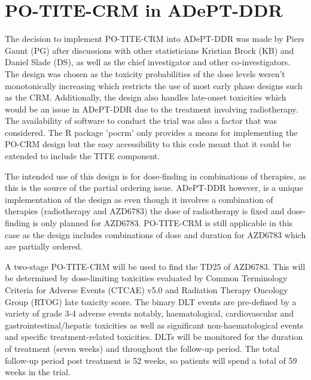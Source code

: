 
\section{PO-TITE-CRM in ADePT-DDR}  
\label{adept:PO-TITE-CRM-in-Adept}

The decision to implement PO-TITE-CRM into ADePT-DDR was made by Piers Gaunt (PG) after discussions with other statisticians Kristian Brock (KB) and Daniel Slade (DS), as well as the chief investigator and other co-investigators. The design was chosen as the toxicity probabilities of the dose levels weren't monotonically increasing which restricts the use of most early phase designs such as the CRM. Additionally, the design also handles late-onset toxicities which would be an issue in ADePT-DDR due to the treatment involving radiotherapy. The availability of software to conduct the trial was also a factor that was considered. The R package 'pocrm' \cite{wagesPocrmRpackagePhase2013} only provides a means for implementing the PO-CRM design but the easy accessibility to this code meant that it could be extended to include the TITE component.  

The intended use of this design is for dose-finding in combinations of therapies, as this is the source of the partial ordering issue. ADePT-DDR however, is a unique implementation of the design as even though it involves a combination of therapies (radiotherapy and AZD6783) the dose of radiotherapy is fixed and dose-finding is only planned for AZD6783. PO-TITE-CRM is still applicable in this case as the design includes combinations of dose and duration for AZD6783 which are partially ordered. 

A two-stage PO-TITE-CRM will be used to find the TD25 of AZD6783. This will be determined by dose-limiting toxicities evaluated by Common Terminology Criteria for Adverse Events (CTCAE) v5.0 and Radiation Therapy Oncology Group (RTOG) late toxicity score. The binary DLT events are pre-defined by a variety of grade 3-4 adverse events notably, haematological, cardiovascular and gastrointestinal/hepatic toxicities as well as significant non-haematological events and specific treatment-related toxicities. DLTs will be monitored for the duration of treatment (seven weeks) and throughout the follow-up period. The total follow-up period post treatment is 52 weeks, so patients will spend a total of 59 weeks in the trial.  

